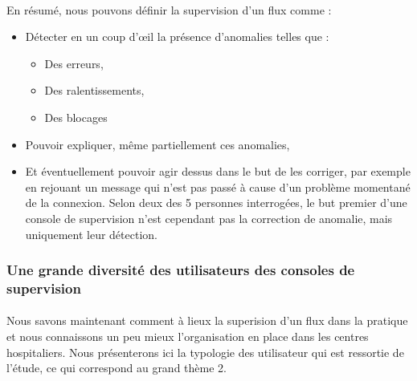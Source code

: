 			\paragraph{}
			En résumé, nous pouvons définir la supervision d'un flux comme :
			\begin{itemize}
			  \item Détecter en un coup d’œil la présence d’anomalies telles que :
			  	\begin{itemize}
			  	  \item Des erreurs,
			  	  \item Des ralentissements,
			  	  \item Des blocages
		  	    \end{itemize}
			  \item Pouvoir expliquer, même partiellement ces anomalies,
			  \item Et éventuellement pouvoir agir dessus dans le but de les corriger,
			  par exemple en rejouant un message qui n’est pas passé à cause d’un
			  problème momentané de la connexion. Selon deux des 5 personnes interrogées,
			  le but premier d'une console de supervision n'est cependant pas la
			  correction de anomalie, mais uniquement leur détection.
			\end{itemize}
			
		\subsubsection{Une grande diversité des utilisateurs des consoles de
		supervision}
			\paragraph{}%
			Nous savons maintenant comment à lieux la superision d'un flux dans la
			pratique et nous connaissons un peu mieux l'organisation en place dans les
			centres hospitaliers. Nous présenterons ici la typologie des utilisateur qui
			est ressortie de l'étude, ce qui correspond au grand thème 2.
			
